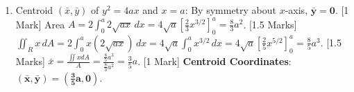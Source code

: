 \begin{solutionbox}
\begin{enumerate}[start=8]
\begin{enumerate}[label=(\alph*)]
        \item Centroid $(\bar{x}, \bar{y})$ of $y^2 = 4ax$ and $x = a$:
        By symmetry about $x$-axis, $\mathbf{\bar{y} = 0}$. [1 Mark]
        Area $A = 2 \int_0^a 2\sqrt{ax}\,dx = 4\sqrt{a} \left[ \frac{2}{3}x^{3/2} \right]_0^a = \frac{8}{3}a^2$. [1.5 Marks]
        $\iint_R x\,dA = 2 \int_0^a x (2\sqrt{ax})\,dx = 4\sqrt{a} \int_0^a x^{3/2}\,dx = 4\sqrt{a} \left[ \frac{2}{5}x^{5/2} \right]_0^a = \frac{8}{5}a^3$. [1.5 Marks]
        $\bar{x} = \frac{\iint x dA}{A} = \frac{\frac{8}{5}a^3}{\frac{8}{3}a^2} = \frac{3}{5}a$. [1 Mark]
        \textbf{Centroid Coordinates}: $\mathbf{(\bar{x}, \bar{y}) = \left(\frac{3}{5}a, 0\right)}$.
    \end{enumerate}
\end{enumerate}
\end{solutionbox}
